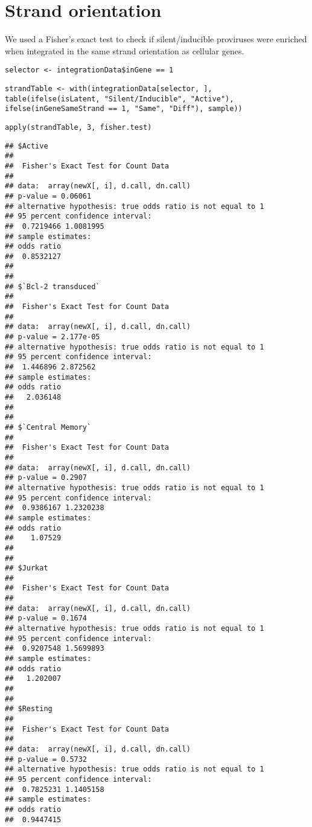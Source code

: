 \documentclass[../../sherrill-Mix_thesis.tex]{subfiles}
\makeatletter
\newenvironment{kframe}{%
 \def\at@end@of@kframe{}%
 \ifinner\ifhmode%
  \def\at@end@of@kframe{\end{minipage}}%
  \begin{minipage}{\columnwidth}%
 \fi\fi%
 \def\FrameCommand##1{\hskip\@totalleftmargin \hskip-\fboxsep
 \colorbox{shadecolor}{##1}\hskip-\fboxsep
     \hskip-\linewidth \hskip-\@totalleftmargin \hskip\columnwidth}%
 \MakeFramed {\advance\hsize-\width
   \@totalleftmargin\z@ \linewidth\hsize
   \@setminipage}}%
 {\par\unskip\endMakeFramed%
 \at@end@of@kframe}
\newenvironment{knitrout}{}{} %
\makeatother
\begin{document}
\section{Strand orientation}
We used a Fisher's exact test to check if silent/inducible proviruses were enriched when integrated in the same strand orientation as cellular genes. 
\begin{knitrout}
\color{fgcolor}\begin{kframe}
\begin{lstlisting}[basicstyle=\ttfamily,breaklines=true]
selector <- integrationData$inGene == 1\end{lstlisting}
\begin{lstlisting}[basicstyle=\ttfamily,breaklines=true]
strandTable <- with(integrationData[selector, ], table(ifelse(isLatent, "Silent/Inducible", "Active"), ifelse(inGeneSameStrand == 1, "Same", "Diff"), sample))\end{lstlisting}
\begin{lstlisting}[basicstyle=\ttfamily,breaklines=true]
apply(strandTable, 3, fisher.test)\end{lstlisting}
\begin{lstlisting}[basicstyle=\ttfamily,breaklines=true]
## $Active
## 
## 	Fisher's Exact Test for Count Data
## 
## data:  array(newX[, i], d.call, dn.call)
## p-value = 0.06061
## alternative hypothesis: true odds ratio is not equal to 1
## 95 percent confidence interval:
##  0.7219466 1.0081995
## sample estimates:
## odds ratio 
##  0.8532127 
## 
## 
## $`Bcl-2 transduced`
## 
## 	Fisher's Exact Test for Count Data
## 
## data:  array(newX[, i], d.call, dn.call)
## p-value = 2.177e-05
## alternative hypothesis: true odds ratio is not equal to 1
## 95 percent confidence interval:
##  1.446896 2.872562
## sample estimates:
## odds ratio 
##   2.036148 
## 
## 
## $`Central Memory`
## 
## 	Fisher's Exact Test for Count Data
## 
## data:  array(newX[, i], d.call, dn.call)
## p-value = 0.2907
## alternative hypothesis: true odds ratio is not equal to 1
## 95 percent confidence interval:
##  0.9386167 1.2320238
## sample estimates:
## odds ratio 
##    1.07529 
## 
## 
## $Jurkat
## 
## 	Fisher's Exact Test for Count Data
## 
## data:  array(newX[, i], d.call, dn.call)
## p-value = 0.1674
## alternative hypothesis: true odds ratio is not equal to 1
## 95 percent confidence interval:
##  0.9207548 1.5699893
## sample estimates:
## odds ratio 
##   1.202007 
## 
## 
## $Resting
## 
## 	Fisher's Exact Test for Count Data
## 
## data:  array(newX[, i], d.call, dn.call)
## p-value = 0.5732
## alternative hypothesis: true odds ratio is not equal to 1
## 95 percent confidence interval:
##  0.7825231 1.1405158
## sample estimates:
## odds ratio 
##  0.9447415
\end{lstlisting}
\end{kframe}
\end{knitrout}
\end{document}
